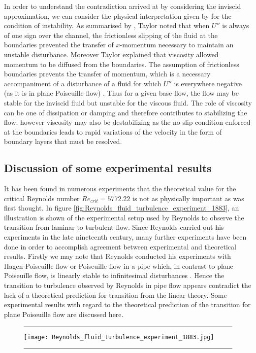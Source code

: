 \documentclass[a4paper, 12pt, twoside, openright]{article}
\numberwithin{equation}{section}
\begin{document}
In order to understand the contradiction arrived at by considering the inviscid approximation, we can consider the physical interpretation given by \cite{Taylor15} for the condition of instability. As summarised by \cite{DrazinHoward66}, Taylor noted that when $U''$ is always of one sign over the channel, the frictionless slipping of the fluid at the boundaries prevented the transfer of $x$-momentum necessary to maintain an unstable disturbance. Moreover Taylor explained that viscosity allowed momentum to be diffused from the boundaries. The assumption of frictionless boundaries prevents the transfer of momentum, which is a necessary accompaniment of a disturbance of a fluid for which $U''$ is everywhere negative (as it is in plane Poiseuille flow) \citep{Taylor15}. Thus for a given base flow, the flow may be stable for the inviscid fluid but unstable for the viscous fluid. The role of viscosity can be one of dissipation or damping and therefore contributes to stabilizing the flow, however viscosity may also be destabilizing as the no-slip condition enforced at the boundaries leads to rapid variations of the velocity in the form of boundary layers that must be resolved. 

\subsection{Discussion of some experimental results}
% 

It has been found in numerous experiments that the theoretical value for the critical Reynolds number $Re_{crit}=5772.22$ is not as physically important as was first thought. In figure \ref{fig:Reynolds_fluid_turbulence_experiment_1883}, an illustration is shown of the experimental setup used by Reynolds to observe the transition from laminar to turbulent flow. Since Reynolds carried out his experiments in the late nineteenth century, many further experiments have been done in order to accomplish agreement between experimental and theoretical results. Firstly we may note that Reynolds conducted his experiments with Hagen-Poiseuille flow or Poiseuille flow in a pipe which, in contrast to plane Poiseuille flow, is linearly stable to infinitesimal disturbances \citep{Davey73}. Hence the transition to turbulence observed by Reynolds in pipe flow appears contradict the lack of a theoretical prediction for transition from the linear theory. Some experimental results with regard to the theoretical prediction of the transition for plane Poiseuille flow are discussed here. %
\begin{figure}[h]
\centering
\rule{\linewidth}{.4pt}
\texttt{[image: Reynolds\_fluid\_turbulence\_experiment\_1883.jpg]}
\rule{\linewidth}{.4pt}
\end{figure}
\end{document}
